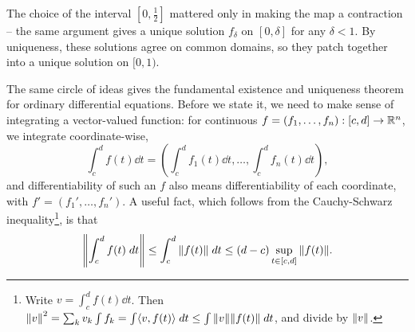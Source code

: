 \documentclass[a4paper]{scrartcl}
\begin{document}
\begin{remark}
    The choice of the interval $[0, \tfrac{1}{2}]$ mattered only in making the map a contraction -- the same argument gives a unique solution $f_{\delta}$ on $[0, \delta]$ for any $\delta < 1$. By uniqueness, these solutions agree on common domains, so they patch together into a unique solution on $[0, 1)$.
\end{remark}

The same circle of ideas gives the fundamental existence and uniqueness theorem for ordinary differential equations. Before we state it, we need to make sense of integrating a vector-valued function: for continuous $f = (f_1, \dots, f_n): [c, d] \rightarrow \mathbb{R}^n$, we integrate coordinate-wise,
$$
\int_c^d f(t) \dd t = \left( \int_c^d f_1(t) \dd t, \dots, \int_c^d f_n(t)\dd t \right),
$$
and differentiability of such an $f$ also means differentiability of each coordinate, with $f' = (f_1', \dots, f_n')$. A useful fact, which follows from the Cauchy-Schwarz inequality\footnote{Write $v = \int_c^d f(t) \dd t$. Then $\norm{v}^2 = \sum_k v_k \int f_k = \int \langle v, f(t)\rangle \; d t \leq \int \norm{v} \norm{f(t)} \; d t$, and divide by $\norm{v}$.}, is that
$$
\norm{\int_c^d f(t) \; d t} \leq \int_c^d \norm{f(t)} \; d t \leq (d - c)\sup_{t \in [c, d]} \norm{f(t)}.
$$
\end{document}
